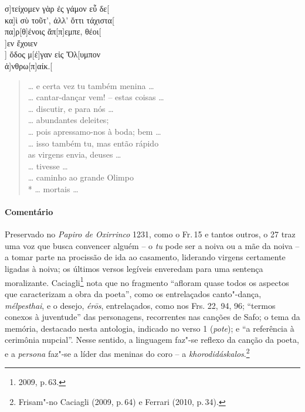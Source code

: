 {\begin{gkverse}
σ]τείχομεν γὰρ ἐς γάμον εὖ δε[\\
κα]ὶ σὺ τοῦτ’, ἀλλ’ ὄττι τάχιστα[\\
πα]ρ[θ]ένοις ἄπ[π]εμπε, θέοι[\\
]εν ἔχοιεν\\
      ] ὄδος μ[έ]γαν εἰς Ὄλ[υμπον\\
       ἀ]νθρω[π\qquad]αίκ.[
\end{gkverse}
\pagebreak
\begin{verse}
\ldots{} e certa vez tu também menina \ldots{}\\
\ldots{} cantar-dançar vem! -- estas coisas \ldots{}\\
\ldots{} discutir, e para nós \ldots{}\\
\ldots{} abundantes deleites;\\
\ldots{} pois apressamo-nos à boda; bem \ldots{}\\
\ldots{} isso também tu, mas então rápido\\
as virgens envia, deuses \ldots{}\\
\ldots{} tivesse \ldots{}\\
\ldots{} caminho ao grande Olimpo\\*
\ldots{} mortais \ldots{}
\end{verse}

\medskip

{\paragraph{Comentário} Preservado no \textit{Papiro de Oxirrinco} 1231, como o Fr.\,15 e tantos outros, o 27 traz uma voz que busca convencer alguém  -- o \textit{tu}
pode ser a noiva ou a mãe da noiva -- a tomar parte na procissão de
ida ao casamento, liderando virgens certamente ligadas à noiva; os últimos versos
legíveis enveredam para uma sentença moralizante.
Caciagli\footnote{2009, p.\,63.} nota que no fragmento ``afloram quase todos os aspectos que caracterizam a obra da poeta'', como os entrelaçados canto"-dança, \textit{mélpesthai}, e o desejo, \textit{érōs}, entrelaçados, como nos Frs. 22, 94, 96; ``termos conexos à juventude'' das personagens, recorrentes nas canções de Safo; o tema da memória, destacado nesta antologia, indicado no verso 1 (\textit{pote}); e ``a referência à cerimônia nupcial''. Nesse sentido, a linguagem faz"-se reflexo da canção da poeta, e a \textit{persona} faz"-se a líder das meninas do coro -- a \textit{khorodidáskalos}.\footnote{Frisam"-no Caciagli (2009, p.\,64) e Ferrari (2010, p.\,34).}}



}
